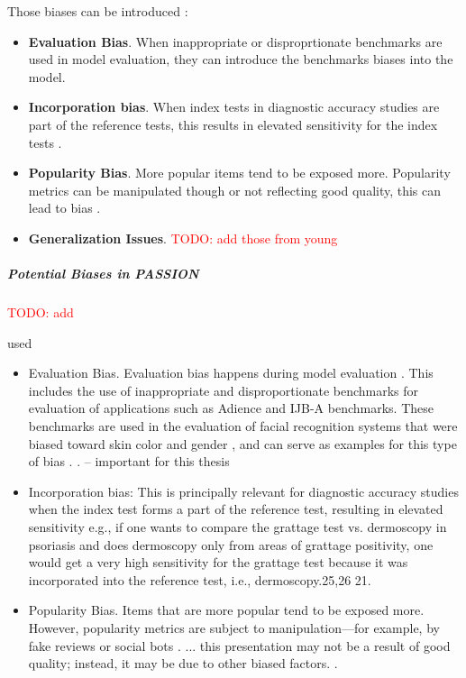 \documentclass[12pt, a4paper, oneside]{book}   	%
\renewcommand{\todo}[1]{\textcolor{red}{TODO: #1}}
\newif\ifrawcitationactive
\newcommand{\rawcitationstart}{
	\color{purple}\rawcitationactivetrue
}
\newcommand{\rawcitationend}{
	\color{black}\rawcitationactivefalse
}
\newcommand{\rawcitationusedstart}{\color{violet}}
\newcommand{\rawcitationusedend}{%
	\ifrawcitationactive
	\color{purple}  %
	\else
	\color{black}  %
	\fi
}
\begin{document}
			Those biases can be introduced :
			\begin{itemize}
				\item \textbf{Evaluation Bias}. When inappropriate or disproprtionate benchmarks are used in model evaluation, they can introduce the benchmarks biases into the model. \autocites{M144_Suresh_2021}{M24_Buolamwini_2018}
				
				\item  \textbf{Incorporation bias}. When index tests in diagnostic accuracy studies are part of the reference tests, this results in elevated sensitivity for the index tests \autocites{Chakraborty_2024, c21, c25, c26}{Young_2020}.
				
				\item \textbf{Popularity Bias}. More popular items tend to be exposed more. Popularity metrics can be manipulated though or not reflecting good quality, this can lead to bias \autocites{M117_Ciampaglia_2018}{Mehrabi_2021}.
				
				\item \textbf{Generalization Issues}.  \autocite{} \todo{add those from young}
			\end{itemize}
			
			
			\subparagraph{Potential Biases in PASSION}
			\todo{add}
			
			\rawcitationstart
			used
			\begin{itemize}		
				\rawcitationusedstart
					\item Evaluation Bias. Evaluation bias happens during model evaluation \autocite{M144_Suresh_2021}. This includes the use of inappropriate and disproportionate benchmarks for evaluation of applications such as Adience and IJB-A benchmarks. These benchmarks are used in the evaluation of facial recognition systems that were biased toward skin color and gender \autocite{M24_Buolamwini_2018}, and can serve as examples for this type of bias \autocite{M144_Suresh_2021}. \autocite{Mehrabi_2021}. -- important for this thesis
					
					\item  Incorporation bias: This is principally relevant for diagnostic accuracy studies when the index test forms a part of the reference test, resulting in elevated sensitivity e.g., if one wants to compare the grattage test vs. dermoscopy in psoriasis and does dermoscopy only from areas of grattage positivity, one would get a very high sensitivity for the grattage test because it was incorporated into the reference test, i.e., dermoscopy.25,26 21.\autocite{Chakraborty_2024}
					
					\item Popularity Bias. Items that are more popular tend to be exposed more. However, popularity metrics are subject to manipulation—for example, by fake reviews or social bots \autocite{M117_Ciampaglia_2018}. ... this presentation may not be a result of good quality; instead, it may be due to other biased factors. \autocite{Mehrabi_2021}.
				\rawcitationusedend
			\end{itemize}
			\rawcitationend
			
\end{document}
